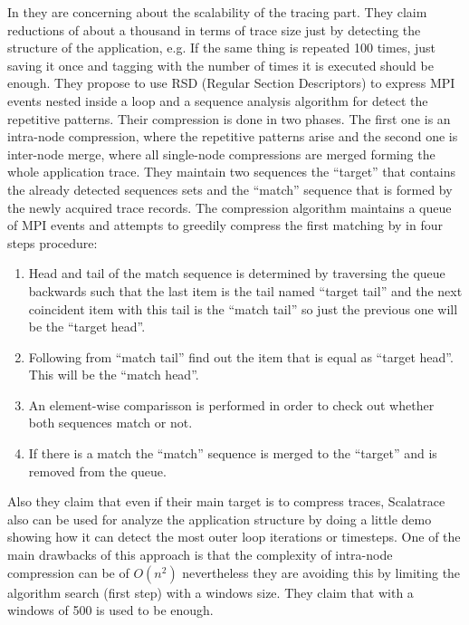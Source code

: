 In \cite{noeth2009scalatrace} they are concerning about the scalability of the
tracing part. They claim reductions of about a
thousand in terms of trace size just by detecting the structure of the
application, e.g. If the same thing is repeated 100 times, just saving it once
and tagging with the number of times it is executed should be enough. They
propose to use RSD (Regular Section Descriptors) to express MPI events nested
inside a loop and a sequence analysis algorithm for detect the repetitive 
patterns. Their compression
is done in two phases. The first one is an intra-node compression, where the
repetitive patterns arise and the second one is inter-node merge, where all
single-node compressions are merged forming the whole application trace.
They maintain two sequences the ``target'' that contains the already detected
sequences sets and the ``match'' sequence that is formed by the newly acquired
trace records. The compression algorithm maintains a queue of MPI events and 
attempts to greedily compress the first matching by  in four steps procedure:
\begin{enumerate}[label=\roman*)]
  \item Head and tail of the match sequence is determined by traversing the
    queue backwards such that the last item is the tail named ``target tail''
    and the next coincident item with this tail is the ``match tail'' so just
    the previous one will be the ``target head''.
  \item Following from ``match tail'' find out the item that is equal as
    ``target head''. This will be the ``match head''.
  \item An element-wise comparisson is performed in order to check out whether 
    both sequences match or not.
  \item If there is a match the ``match'' sequence is merged to the ``target''
    and is removed from the queue.
\end{enumerate}
Also they claim
that even if their main target is to compress traces, Scalatrace also can be
used for analyze the application structure by doing a little demo showing how it
can detect the most outer loop iterations or timesteps. One of the main
drawbacks of this approach is that the complexity of intra-node compression 
can be of $O(n^2)$ nevertheless they are avoiding this by
limiting the algorithm search (first step) with a windows size. They claim that
with a windows of 500 is used to be enough. 

